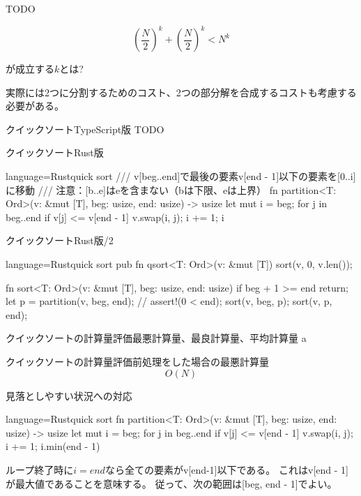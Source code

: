 \documentclass{beamer}
\begin{document}
\begin{frame}[fragile]{}{}
TODO


\[
\left(\frac{N}{2}\right)^k + \left(\frac{N}{2}\right)^k < N^k
\]

が成立する$k$とは?

実際には2つに分割するためのコスト、2つの部分解を合成するコストも考慮する必要がある。
\end{frame}


\begin{frame}[fragile]{クイックソートTypeScript版}{}
TODO
\end{frame}

\begin{frame}[fragile]{クイックソートRust版}{}
\begin{codeof}{language=Rust}{quick sort}
/// v[beg..end]で最後の要素v[end - 1]以下の要素を[0..i]に移動
/// 注意：[b..e]はeを含まない（bは下限、eは上界）
fn partition<T: Ord>(v: &mut [T], beg: usize, end: usize) -> usize {
    let mut i = beg;
    for j in beg..end {
        if v[j] <= v[end - 1] {
            v.swap(i, j);
            i += 1;
        }
    }
    i
}
\end{codeof}
\end{frame}

\begin{frame}[fragile]{クイックソートRust版/2}{}
\begin{codeof}{language=Rust}{quick sort}
pub fn qsort<T: Ord>(v: &mut [T]) {
    sort(v, 0, v.len());
}

fn sort<T: Ord>(v: &mut [T], beg: usize, end: usize) {
    if beg + 1 >= end {
        return;
    }
    let p = partition(v, beg, end); // assert!(0 < end);
    sort(v, beg, p);
    sort(v, p, end);
}
\end{codeof}
\end{frame}

\begin{frame}[fragile]{クイックソートの計算量評価}{最悪計算量、最良計算量、平均計算量}
a
\end{frame}

\begin{frame}[fragile]{クイックソートの計算量評価}{前処理をした場合の最悪計算量}
\[
O(N)
\]
\end{frame}

\begin{frame}[fragile]{見落としやすい状況への対応}{}
\begin{codeof}{language=Rust}{quick sort}
fn partition<T: Ord>(v: &mut [T], beg: usize, end: usize) -> usize {
    let mut i = beg;
    for j in beg..end {
        if v[j] <= v[end - 1] {
            v.swap(i, j);
            i += 1;
        }
    }
    i.min(end - 1)
}
\end{codeof}

ループ終了時に$i = end$なら全ての要素がv[end-1]以下である。
これはv[end - 1]が最大値であることを意味する。
従って、次の範囲は[beg, end - 1]でよい。
\end{frame}
\end{document}
